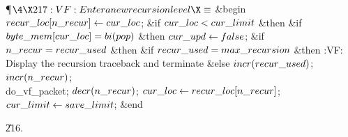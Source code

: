 \Y\P$\4\X217:VF: Enter a new recursion level\X\S$\6
\&{begin} $\\{recur\_loc}[\\{n\_recur}]\gets\\{cur\_loc}$;\6
\&{if} $\\{cur\_loc}<\\{cur\_limit}$ \1\&{then}\6
\&{if} $\\{byte\_mem}[\\{cur\_loc}]=\\{bi}(\\{pop})$ \1\&{then}\5
$\\{cur\_upd}\gets\\{false}$;\2\2\6
\&{if} $\\{n\_recur}=\\{recur\_used}$ \1\&{then}\6
\&{if} $\\{recur\_used}=\\{max\_recursion}$ \1\&{then}\5
:VF: Display the recursion traceback and terminate\X\6
\4\&{else} $\\{incr}(\\{recur\_used})$;\2\2\6
$\\{incr}(\\{n\_recur})$;\5
\\{do\_vf\_packet};\5
$\\{decr}(\\{n\_recur})$;\6
$\\{cur\_loc}\gets\\{recur\_loc}[\\{n\_recur}]$;\5
$\\{cur\_limit}\gets\\{save\_limit}$;\6
\&{end}\par
\U216.\fi

